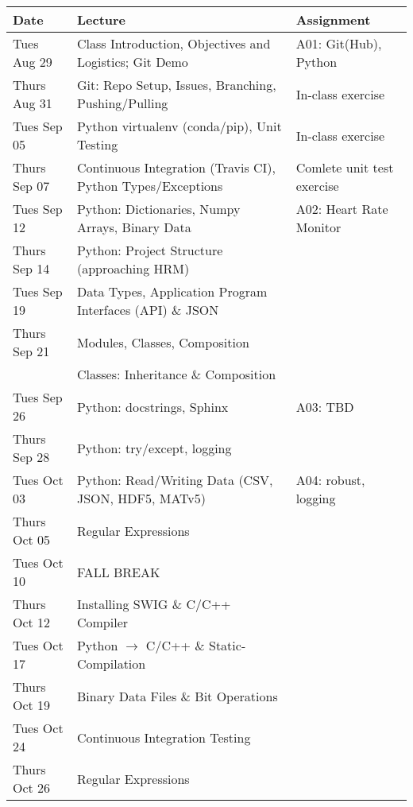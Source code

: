 \begin{longtable}[c]{|l|l|l|}

    \hline 
    
    \textbf{Date} & \textbf{Lecture} & \textbf{Assignment}\\

    \hline

    Tues Aug 29     & Class Introduction, Objectives and Logistics; Git Demo & A01: Git(Hub), Python\\
    Thurs Aug 31    & Git: Repo Setup, Issues, Branching, Pushing/Pulling & In-class exercise\\
    \hline
    Tues Sep 05     & Python virtualenv (conda/pip), Unit Testing & In-class exercise\\
    Thurs Sep 07    & Continuous Integration (Travis CI), Python Types/Exceptions & Comlete unit test exercise\\
    \hline
    Tues Sep 12     & Python: Dictionaries, Numpy Arrays, Binary Data & A02: Heart Rate Monitor \\
    Thurs Sep 14    & Python: Project Structure (approaching HRM) & \\
    \hline
    Tues Sep 19     & Data Types, Application Program Interfaces (API) \& JSON & \\
    Thurs Sep 21    & Modules, Classes, Composition& \\
                    & Classes: Inheritance \& Composition & \\
    \hline
    Tues Sep 26     & Python: docstrings, Sphinx & A03: TBD\\
    Thurs Sep 28    & Python: try/except, logging & \\
    \hline
    Tues Oct 03     & Python: Read/Writing Data (CSV, JSON, HDF5, MATv5) & A04: robust, logging \\
    Thurs Oct 05    & Regular Expressions & \\
    \hline
    Tues Oct 10     & FALL BREAK & \\
    Thurs Oct 12    & Installing SWIG \& C/C++ Compiler & \\
    \hline
    Tues Oct 17     & Python $\rightarrow$ C/C++ \& Static-Compilation & \\
    Thurs Oct 19    & Binary Data Files \& Bit Operations & \\
    \hline
    Tues Oct 24     & Continuous Integration Testing & \\
    Thurs Oct 26    & Regular Expressions & \\
    \hline

\end{longtable}
